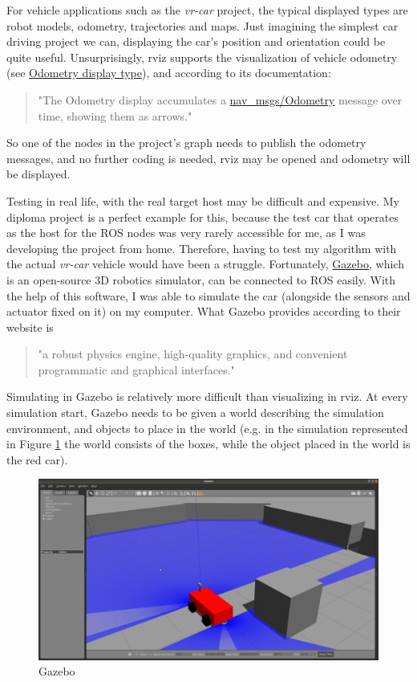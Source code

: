 For vehicle applications such as the \textit{vr-car} project, the typical displayed types are robot models, odometry, trajectories and maps. Just imagining the simplest car driving project we can, displaying the car's position and orientation could be quite useful. Unsurprisingly, rviz supports the visualization of vehicle odometry (see \href{http://wiki.ros.org/rviz/DisplayTypes/Odometry}{Odometry display type}), and according to its documentation:

\begin{quote}
"The Odometry display accumulates a \href{http://docs.ros.org/api/nav_msgs/html/msg/Odometry.html}{nav\_msgs/Odometry} message over time, showing them as arrows."
\end{quote}

So one of the nodes in the project's graph needs to publish the odometry messages, and no further coding is needed, rviz may be opened and odometry will be displayed.

Testing in real life, with the real target host may be difficult and expensive. My diploma project is a perfect example for this, because the test car that operates as the host for the ROS nodes was very rarely accessible for me, as I was developing the project from home. Therefore, having to test my algorithm with the actual \textit{vr-car} vehicle would have been a struggle. Fortunately, \href{http://gazebosim.org/}{Gazebo}, which is an open-source 3D robotics simulator, can be connected to ROS easily. With the help of this software, I was able to simulate the car (alongside the sensors and actuator fixed on it) on my computer. What Gazebo provides according to their website is

\begin{quote}
"a robust physics engine, high-quality graphics, and convenient programmatic and graphical interfaces."
\end{quote}

Simulating in Gazebo is relatively more difficult than visualizing in rviz. At every simulation start, Gazebo needs to be given a world describing the simulation environment, and objects to place in the world (e.g. in the simulation represented in Figure \ref{gazebo} the world consists of the boxes, while the object placed in the world is the red car).

\begin{figure}[!ht]
	\centering
	\includegraphics[width=\textwidth]{figures/raw/gazebo.png}
	\caption{Gazebo}
	\label{gazebo}
\end{figure}

